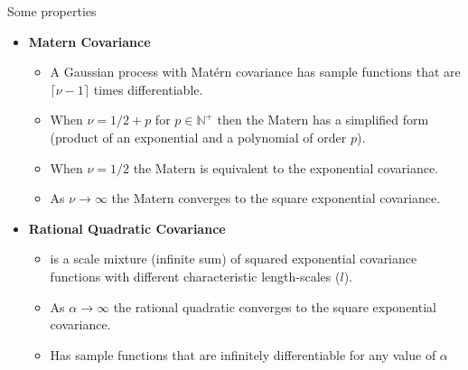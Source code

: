 \documentclass[11pt,ignorenonframetext,]{beamer}
\providecommand{\tightlist}{%
  \setlength{\itemsep}{0pt}\setlength{\parskip}{0pt}}
\begin{document}
\begin{frame}[t]{Some properties}

\begin{itemize}
\tightlist
\item
  \textbf{Matern Covariance}

  \begin{itemize}
  \tightlist
  \item
    A Gaussian process with Matérn covariance has sample functions that
    are \(\lceil \nu -1\rceil\) times differentiable. \vspace{1mm}
  \item
    When \(\nu = 1/2 + p\) for \(p \in \mathbb{N}^+\) then the Matern
    has a simplified form (product of an exponential and a polynomial of
    order \(p\)). \vspace{1mm}
  \item
    When \(\nu = 1/2\) the Matern is equivalent to the exponential
    covariance. \vspace{1mm}\\
  \item
    As \(\nu \to \infty\) the Matern converges to the square exponential
    covariance.
  \end{itemize}
\end{itemize}

\vspace{2mm}

\begin{itemize}
\tightlist
\item
  \textbf{Rational Quadratic Covariance}

  \begin{itemize}
  \tightlist
  \item
    is a scale mixture (infinite sum) of squared exponential covariance
    functions with different characteristic length-scales (\(l\)).
    \vspace{1mm}
  \item
    As \(\alpha \to \infty\) the rational quadratic converges to the
    square exponential covariance. \vspace{1mm}
  \item
    Has sample functions that are infinitely differentiable for any
    value of \(\alpha\)
  \end{itemize}
\end{itemize}

\end{frame}
\end{document}

